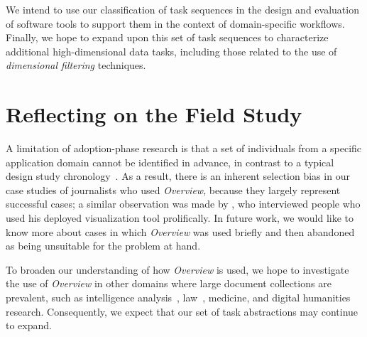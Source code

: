 We intend to use our classification of task sequences in the design and evaluation of software tools to support them in the context of domain-specific workflows.
Finally, we hope to expand upon this set of task sequences to characterize additional high-dimensional data tasks, including those related to the use of {\it dimensional filtering} techniques.


\section{Reflecting on the Field Study}
\label{conclusions:overview}


A limitation of adoption-phase research is that a set of individuals from a specific application domain cannot be identified in advance, in contrast to a typical design study chronology~\cite{Sedlmair2012}.
As a result, there is an inherent selection bias in our case studies of journalists who used {\it Overview}, because they largely represent successful cases; a similar observation was made by \citet{McKeon2009}, who interviewed people who used his deployed visualization tool prolifically.
In future work, we would like to know more about cases in which {\it Overview} was used briefly and then abandoned as being unsuitable for the problem at hand.

To broaden our understanding of how {\it Overview} is used, we hope to investigate the use of {\it Overview} in other domains where large document collections are prevalent, such as intelligence analysis~\cite{Kang2012}, law~\cite{Grossman2011}, medicine, and digital humanities research.
Consequently, we expect that our set of task abstractions may continue to expand.


